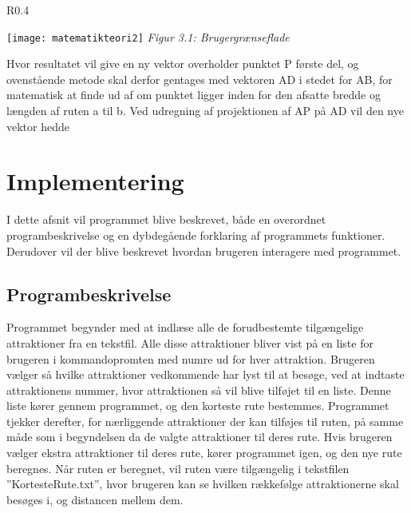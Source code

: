 \begin{wrapfigure}{R}{0.4\textwidth}
  \vspace{-45pt}
  \begin{center}
    \texttt{[image: matematikteori2]} \newline
    \textit{Figur 3.1: Brugergrænseflade}\newline
  \end{center}
  \vspace{-60pt}
\end{wrapfigure}

Hvor resultatet vil give en ny vektor %
overholder punktet P første del, og ovenstående metode skal derfor gentages med vektoren AD i stedet for AB, for matematisk at finde ud af om punktet ligger inden 	for den afsatte bredde og længden af ruten a til b. Ved udregning af projektionen af AP på AD vil den nye vektor hedde	%


\section{Implementering}
I dette afsnit vil programmet blive beskrevet, både en overordnet programbeskrivelse og en dybdegående forklaring af programmets funktioner. Derudover vil der blive beskrevet hvordan brugeren interagere med programmet. 

\subsection{Programbeskrivelse}
Programmet begynder med at indlæse alle de forudbestemte tilgængelige attraktioner fra en tekstfil. Alle disse attraktioner bliver vist på en liste for brugeren i kommandopromten med numre ud for hver attraktion. Brugeren vælger så hvilke attraktioner vedkommende har lyst til at besøge, ved at indtaste attraktionens nummer, hvor attraktionen så vil blive tilføjet til en liste. Denne liste kører gennem programmet, og den korteste rute bestemmes. Programmet tjekker derefter, for nærliggende attraktioner der kan tilføjes til ruten, på samme måde som i begyndelsen da de valgte attraktioner til deres rute. Hvis brugeren vælger ekstra attraktioner til deres rute, kører programmet igen, og den nye rute beregnes. Når ruten er beregnet, vil ruten være tilgængelig i tekstfilen ”KortesteRute.txt”, hvor brugeren kan se hvilken rækkefølge attraktionerne skal besøges i, og distancen mellem dem. 

